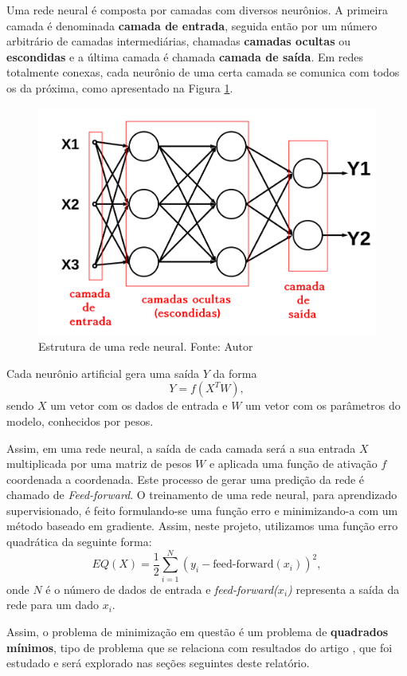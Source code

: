 \documentclass[11pt]{article}
\begin{document}
Uma rede neural é composta por camadas com diversos neurônios. A primeira camada é denominada \textbf{camada de entrada}, seguida então por um número arbitrário de camadas intermediárias, chamadas \textbf{camadas ocultas} ou \textbf{escondidas} e a última camada é chamada \textbf{camada de saída}. Em redes totalmente conexas, cada neurônio de uma certa camada se comunica com todos os da próxima, como apresentado na Figura \ref{fig:layers}.

\begin{figure}[H]
\centering 
\includegraphics[scale=0.3]{Figuras/layers.png}
\caption{Estrutura de uma rede neural. Fonte: Autor} 
\label{fig:layers}
\end{figure} 

Cada neurônio artificial gera uma saída $Y$ da forma
$$Y = f(X^{T}W),$$
sendo $X$ um vetor com os dados de entrada e $W$ um vetor com os parâmetros do modelo, conhecidos por pesos.


Assim, em uma rede neural, a saída de cada camada será a sua entrada $X$ multiplicada por uma matriz de pesos $W$ e aplicada uma função de ativação $f$ coordenada a coordenada. Este processo de gerar uma predição da rede é chamado de \textit{Feed-forward}.
O treinamento de uma rede neural, para aprendizado supervisionado, é feito formulando-se uma função erro e minimizando-a com um método baseado em gradiente. Assim, neste projeto, utilizamos uma função erro quadrática da seguinte forma:
$$EQ(X) = \frac{1}{2} \sum_{i=1}^{N} (y_i - \text{feed-forward}(x_i) )^2,$$
onde $N$ é o número de dados de entrada e \textit{feed-forward($x_i$)} representa a saída da rede para um dado $x_i$.

Assim, o problema de minimização em questão é um problema de \textbf{quadrados mínimos}, tipo de problema que se relaciona com resultados do artigo  \cite{bmLS}, que foi estudado e será explorado nas seções seguintes deste relatório. 
\end{document}
